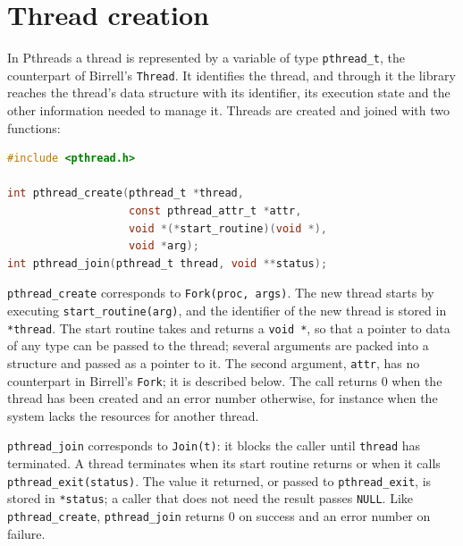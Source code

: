 \documentclass[../main.tex]{subfiles}
\begin{document}
\section{Thread creation}
\label{sec:l04-creation}

In Pthreads a thread is represented by a variable of type
\texttt{pthread\_t}, the counterpart of Birrell's
\texttt{Thread}.  It identifies the thread, and through it the library reaches the
thread's data structure with its identifier, its execution state and the
other information needed to manage it.  Threads
are created and joined with
two functions:
\begin{lstlisting}[language=C, numbers=none]
#include <pthread.h>

int pthread_create(pthread_t *thread,
                   const pthread_attr_t *attr,
                   void *(*start_routine)(void *),
                   void *arg);
int pthread_join(pthread_t thread, void **status);
\end{lstlisting}

\texttt{pthread\_create} corresponds to \texttt{Fork(proc, args)}.  The new
thread starts by executing \texttt{start\_routine(arg)}, and the identifier
of the new thread is stored in \texttt{*thread}.  The start routine takes and
returns a \texttt{void~*}, so that a pointer to data of any type can be
passed to the thread; several arguments are packed into a structure and
passed as a pointer to it.  The second argument, \texttt{attr}, has no
counterpart in Birrell's \texttt{Fork}; it is described below.  The call
returns 0 when the thread has been created and an error number otherwise,
for instance when the system lacks the resources for another thread.

\texttt{pthread\_join} corresponds to \texttt{Join(t)}: it blocks the caller
until \texttt{thread} has terminated.  A thread terminates when its start
routine returns or when it calls \texttt{pthread\_exit(status)}.  The value
it returned, or passed to \texttt{pthread\_exit}, is stored in
\texttt{*status}; a caller that does not need the result passes
\texttt{NULL}.  Like \texttt{pthread\_create}, \texttt{pthread\_join}
returns 0 on success and an error number on failure.
\end{document}

